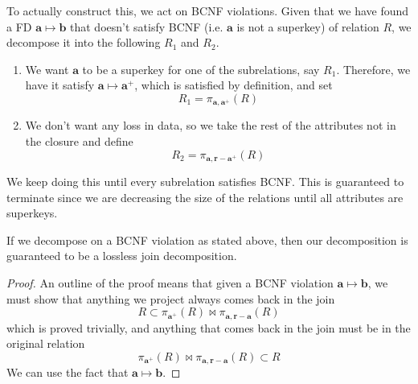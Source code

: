   \begin{algo}
    To actually construct this, we act on BCNF violations. Given that we have found a FD $\mathbf{a} \mapsto \mathbf{b}$ that doesn't satisfy BCNF (i.e. $\mathbf{a}$ is not a superkey) of relation $R$, we decompose it into the following $R_1$ and $R_2$. 
    \begin{enumerate}
      \item We want $\mathbf{a}$ to be a superkey for one of the subrelations, say $R_1$. Therefore, we have it satisfy $\mathbf{a} \mapsto \mathbf{a}^+$, which is satisfied by definition, and set 
        \begin{equation}
          R_1 = \pi_{\mathbf{a}, \mathbf{a}^+} (R)
        \end{equation}
      \item We don't want any loss in data, so we take the rest of the attributes not in the closure and define  
        \begin{equation}
          R_2 = \pi_{\mathbf{a}, \mathbf{r} - \mathbf{a}^+} (R)
        \end{equation}
    \end{enumerate}
    We keep doing this until every subrelation satisfies BCNF. This is guaranteed to terminate since we are decreasing the size of the relations until all attributes are superkeys.  
  \end{algo}

  \begin{theorem}
    If we decompose on a BCNF violation as stated above, then our decomposition is guaranteed to be a lossless join decomposition. 
  \end{theorem}
  \begin{proof}
    An outline of the proof means that given a BCNF violation $\mathbf{a} \mapsto \mathbf{b}$, we must show that anything we project always comes back in the join
    \begin{equation}
      R \subset \pi_{\mathbf{a}^+} (R) \bowtie \pi_{\mathbf{a}, \mathbf{r} - \mathbf{a}} (R)
    \end{equation}
    which is proved trivially, and anything that comes back in the join must be in the original relation
    \begin{equation}
      \pi_{\mathbf{a}^+} (R) \bowtie \pi_{\mathbf{a}, \mathbf{r} - \mathbf{a}} (R) \subset R
    \end{equation}
    We can use the fact that $\mathbf{a} \mapsto \mathbf{b}$. 
  \end{proof}

